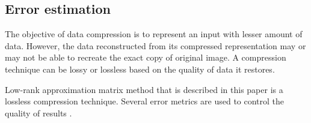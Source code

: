 \subsection{Error estimation}
\label{sec:error}


The objective of data compression is to represent an input with lesser amount of data. However, the data reconstructed from its compressed representation may or may not be able to recreate the exact copy of original image. A compression technique can be lossy or lossless based on the quality of data it restores.

Low-rank approximation matrix method that is described in this paper is a lossless compression technique. Several error metrics are used to control the quality of results \cite{SairaBanu2015}.

